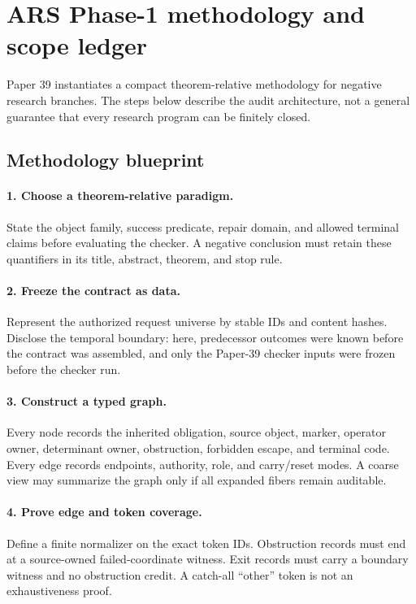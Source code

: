 \section{ARS Phase-1 methodology and scope ledger}
\label{app:methodology}
\small

Paper 39 instantiates a compact theorem-relative methodology for negative
research branches.  The steps below describe the audit architecture, not a
general guarantee that every research program can be finitely closed.

\subsection{Methodology blueprint}

\paragraph{1. Choose a theorem-relative paradigm.}
State the object family, success predicate, repair domain, and allowed terminal
claims before evaluating the checker.  A negative conclusion must retain these
quantifiers in its title, abstract, theorem, and stop rule.

\paragraph{2. Freeze the contract as data.}
Represent the authorized request universe by stable IDs and content hashes.
Disclose the temporal boundary: here, predecessor outcomes were known before
the contract was assembled, and only the Paper-39 checker inputs were frozen
before the checker run.

\paragraph{3. Construct a typed graph.}
Every node records the inherited obligation, source object, marker, operator
owner, determinant owner, obstruction, forbidden escape, and terminal code.
Every edge records endpoints, authority, role, and carry/reset modes.  A coarse
view may summarize the graph only if all expanded fibers remain auditable.

\paragraph{4. Prove edge and token coverage.}
Define a finite normalizer on the exact token IDs.  Obstruction records must
end at a source-owned failed-coordinate witness.  Exit records must carry a
boundary witness and no obstruction credit.  A catch-all “other” token is not
an exhaustiveness proof.

